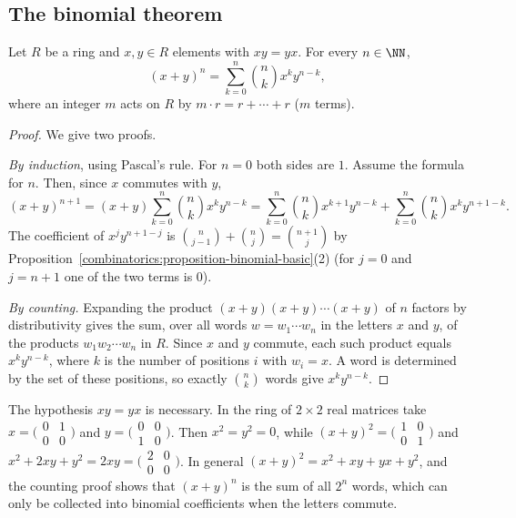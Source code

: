 \subsection{The binomial theorem}\label{combinatorics:subsection-binomial-theorem}

\begin{theorem}\label{combinatorics:theorem-binomial}
Let $R$ be a ring and $x, y \in R$ elements with $xy = yx$. For every $n \in \NN$,
\[
(x + y)^n = \sum_{k=0}^{n}\binom{n}{k}x^ky^{n-k},
\]
where an integer $m$ acts on $R$ by $m \cdot r = r + \cdots + r$ ($m$ terms).
\end{theorem}

\begin{proof}
We give two proofs.

\emph{By induction}, using Pascal's rule. For $n = 0$ both sides are $1$. Assume the formula for $n$. Then, since $x$ commutes with $y$,
\[
(x + y)^{n+1} = (x + y)\sum_{k=0}^{n}\binom{n}{k}x^ky^{n-k} = \sum_{k=0}^{n}\binom{n}{k}x^{k+1}y^{n-k} + \sum_{k=0}^{n}\binom{n}{k}x^ky^{n+1-k}.
\]
The coefficient of $x^jy^{n+1-j}$ is $\binom{n}{j-1} + \binom{n}{j} = \binom{n+1}{j}$ by Proposition~\ref{combinatorics:proposition-binomial-basic}(2) (for $j = 0$ and $j = n + 1$ one of the two terms
is $0$).

\emph{By counting.} Expanding the product $(x + y)(x + y) \cdots (x + y)$ of $n$ factors by distributivity gives the sum, over all words $w = w_1 \cdots w_n$ in the letters $x$ and $y$, of the products
$w_1w_2 \cdots w_n$ in $R$. Since $x$ and $y$ commute, each such product equals $x^ky^{n-k}$, where $k$ is the number of positions $i$ with $w_i = x$. A word is determined by the set of these positions,
so exactly $\binom{n}{k}$ words give $x^ky^{n-k}$.
\end{proof}

\begin{counterexample}\label{combinatorics:counterexample-binomial-noncommuting}
The hypothesis $xy = yx$ is necessary. In the ring of $2 \times 2$ real matrices take $x = \bigl(\begin{smallmatrix}0 & 1\\0 & 0\end{smallmatrix}\bigr)$ and $y = \bigl(\begin{smallmatrix}0 & 0\\1 & 0\end{smallmatrix}\bigr)$.
Then $x^2 = y^2 = 0$, while $(x + y)^2 = \bigl(\begin{smallmatrix}1 & 0\\0 & 1\end{smallmatrix}\bigr)$ and $x^2 + 2xy + y^2 = 2xy = \bigl(\begin{smallmatrix}2 & 0\\0 & 0\end{smallmatrix}\bigr)$. In general
$(x + y)^2 = x^2 + xy + yx + y^2$, and the counting proof shows that $(x + y)^n$ is the sum of all $2^n$ words, which can only be collected into binomial coefficients when the letters commute.
\end{counterexample}

